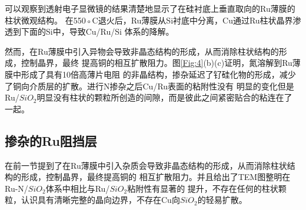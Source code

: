 \documentclass[UTF8,a4paper,12pt]{ctexart}%
\begin{document}
可以观察到透射电子显微镜的结果清楚地显示了在硅衬底上垂直取向的Ru薄膜的柱状微观结构。
在550◦C退火后，Ru薄膜从Si衬底中分离，Cu通过Ru柱状晶界渗透到下面的Si中，导致Cu/Ru/Si
体系的降解。


然而，在Ru薄膜中引入异物会导致非晶态结构的形成，从而消除柱状结构的形成，控制晶界，最终
提高铜的相互扩散阻力。图\ref{Fig:4}(b)(c)证明，氮溶解到Ru薄膜中形成了具有10倍高薄片电阻
的非晶结构，掺杂延迟了钌硅化物的形成，减少了铜向介质层的扩散。进行N掺杂之后Cu/Ru表面的粘附性没有
明显的变化但是Ru/$SiO_2$明显没有柱状的颗粒所创造的间隙，而是彼此之间紧密贴合的粘连在了
一起。



\subsection{掺杂的Ru阻挡层}

在前一节提到了在Ru薄膜中引入杂质会导致非晶态结构的形成，从而消除柱状结构的形成，控制晶界，最终提高铜的
相互扩散阻力。并且给出了TEM图整明在Ru-N/$SiO_2$体系中相比与Ru/$SiO_2$粘附性有显著的
提升，不存在任何的柱状颗粒，认识具有清晰完整的晶向边界，不存在Cu向$SiO_2$的轻易扩散。
\end{document}
